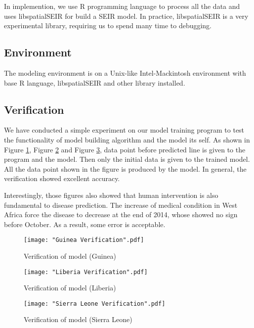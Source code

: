 \documentclass[11pt]{article}
\begin{document}
In implemention, we use R programming language\cite{Rlang} to process all the data and uses libspatialSEIR \cite{libspatialSEIR} for build a SEIR model. In practice, libspatialSEIR is a very experimental library, requiring us to spend many time to debugging.

\subsection{Environment}

The modeling environment is on a Unix-like Intel-Mackintosh environment with base R language, libspatialSEIR and other library installed.

\subsection{Verification}

We have conducted a simple experiment on our model training program to test the functionality of model building algorithm and the model its self. As shown in Figure \ref{GuineaVerification}, Figure \ref{LiberiaVerification} and Figure \ref{SierraLeoneVerification}, data point before predicted line is given to the program and the model. Then only the initial data is given to the trained model. All the data point shown in the figure is produced by the model. In general, the verification showed excellent accuracy.

Interestingly, those figures also showed that human intervention is also fundamental to disease prediction. The increase of medical condition in West Africa force the disease to decrease at the end of 2014, whose showed no sign before October. As a result, some error is acceptable.

\begin{figure}[htbp]
\centerline{\texttt{[image: "Guinea Verification".pdf]}}
\caption{Verification of model (Guinea)}
\label{GuineaVerification}
\end{figure}

\begin{figure}[htbp]
\centerline{\texttt{[image: "Liberia Verification".pdf]}}
\caption{Verification of model (Liberia)}
\label{LiberiaVerification}
\end{figure}

\begin{figure}[htbp]
\centerline{\texttt{[image: "Sierra Leone Verification".pdf]}}
\caption{Verification of model (Sierra Leone)}
\label{SierraLeoneVerification}
\end{figure}
\end{document}
